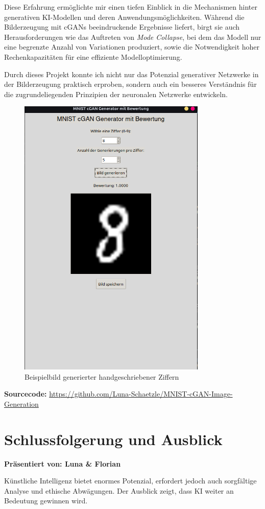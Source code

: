 \documentclass[a4paper,12pt]{article}
\begin{document}
Diese Erfahrung ermöglichte mir einen tiefen Einblick in die Mechanismen hinter generativen KI-Modellen und deren Anwendungsmöglichkeiten. Während die Bilderzeugung mit cGANs beeindruckende Ergebnisse liefert, birgt sie auch Herausforderungen wie das Auftreten von \textit{Mode Collapse}, bei dem das Modell nur eine begrenzte Anzahl von Variationen produziert, sowie die Notwendigkeit hoher Rechenkapazitäten für eine effiziente Modelloptimierung.

Durch dieses Projekt konnte ich nicht nur das Potenzial generativer Netzwerke in der Bilderzeugung praktisch erproben, sondern auch ein besseres Verständnis für die zugrundeliegenden Prinzipien der neuronalen Netzwerke entwickeln.

\begin{figure}[h]
    \centering
    \includegraphics[width=0.8\textwidth]{image.png}
    \caption{Beispielbild generierter handgeschriebener Ziffern}
    \label{fig:example}
\end{figure}

\vspace{0.5cm} \noindent \textbf{Sourcecode:} \url{https://github.com/Luna-Schaetzle/MNIST-cGAN-Image-Generation}


\section{Schlussfolgerung und Ausblick}
\textbf{Präsentiert von: Luna \& Florian}

Künstliche Intelligenz bietet enormes Potenzial, erfordert jedoch auch sorgfältige Analyse und ethische Abwägungen. Der Ausblick zeigt, dass KI weiter an Bedeutung gewinnen wird.

\newpage
\printbibliography
\end{document}
